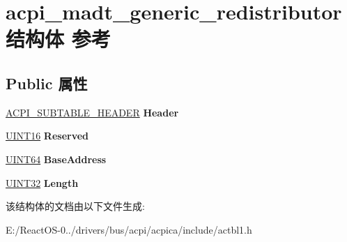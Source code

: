 \hypertarget{structacpi__madt__generic__redistributor}{}\section{acpi\+\_\+madt\+\_\+generic\+\_\+redistributor结构体 参考}
\label{structacpi__madt__generic__redistributor}
\subsection*{Public 属性}
\begin{DoxyCompactItemize}
\item 
\mbox{\label{structacpi__madt__generic__redistributor_a66bbf21b504b5d8001c68cfb4f812854}} 
\hyperlink{structacpi__subtable__header}{A\+C\+P\+I\+\_\+\+S\+U\+B\+T\+A\+B\+L\+E\+\_\+\+H\+E\+A\+D\+ER} {\bfseries Header}
\item 
\mbox{\label{structacpi__madt__generic__redistributor_a5e8bb6a81deaa01a901ae8e33f1d56e8}} 
\hyperlink{_processor_bind_8h_a09f1a1fb2293e33483cc8d44aefb1eb1}{U\+I\+N\+T16} {\bfseries Reserved}
\item 
\mbox{\label{structacpi__madt__generic__redistributor_a2a9da1afe12a03e8e6b4e59575c14f11}} 
\hyperlink{_processor_bind_8h_a57be03562867144161c1bfee95ca8f7c}{U\+I\+N\+T64} {\bfseries Base\+Address}
\item 
\mbox{\label{structacpi__madt__generic__redistributor_afb5ea1114ab1a1e19889e8a3206957b4}} 
\hyperlink{_processor_bind_8h_ae1e6edbbc26d6fbc71a90190d0266018}{U\+I\+N\+T32} {\bfseries Length}
\end{DoxyCompactItemize}


该结构体的文档由以下文件生成\+:\begin{DoxyCompactItemize}
\item 
E\+:/\+React\+O\+S-\/0../drivers/bus/acpi/acpica/include/actbl1.\+h\end{DoxyCompactItemize}
